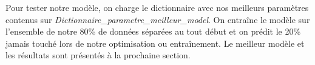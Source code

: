 Pour tester notre modèle, on charge le dictionnaire avec nos meilleurs paramètres contenus sur \emph{Dictionnaire\_parametre\_meilleur\_model}. On entraîne le modèle sur l'ensemble de notre 80\% de données séparées au tout début et on prédit le 20\% jamais touché lors de notre optimisation ou entraînement. Le meilleur modèle et les résultats sont présentés à la prochaine section.
